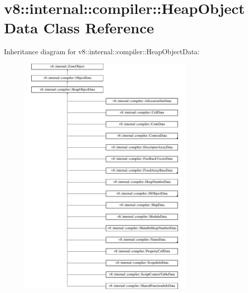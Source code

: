 \hypertarget{classv8_1_1internal_1_1compiler_1_1HeapObjectData}{}\section{v8\+:\+:internal\+:\+:compiler\+:\+:Heap\+Object\+Data Class Reference}
\label{classv8_1_1internal_1_1compiler_1_1HeapObjectData}
Inheritance diagram for v8\+:\+:internal\+:\+:compiler\+:\+:Heap\+Object\+Data\+:\begin{figure}[H]
\begin{center}
\leavevmode
\includegraphics[height=12.000000cm]{classv8_1_1internal_1_1compiler_1_1HeapObjectData}
\end{center}
\end{figure}
